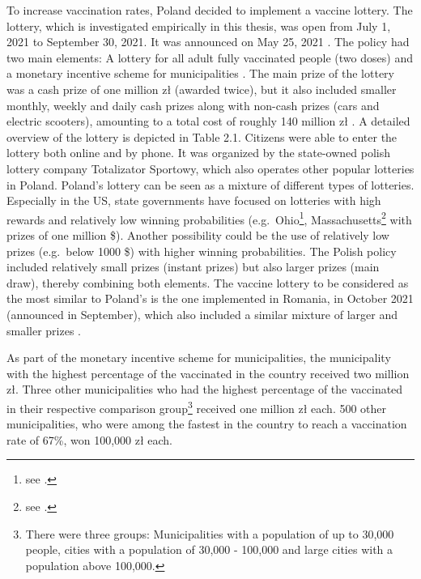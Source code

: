 \documentclass{scrbook}
\begin{document}
To increase vaccination rates, Poland decided to implement a vaccine
lottery. The lottery, which is investigated empirically in this thesis,
was open from July 1, 2021 to September 30, 2021. It was announced on
May 25, 2021 \parencite{charlish_poland_2021}. The policy had two main
elements: A lottery for all adult fully vaccinated people (two doses)
\parencite{service_of_the_republic_of_poland_national_2021} and a
monetary incentive scheme for municipalities
\parencite{service_of_the_republic_of_poland_competitions_2021}. The
main prize of the lottery was a cash prize of one million zł (awarded
twice), but it also included smaller monthly, weekly and daily cash
prizes along with non-cash prizes (cars and electric scooters),
amounting to a total cost of roughly 140 million zł
\parencite{wilczek_poland_2021}. A detailed overview of the lottery is
depicted in Table 2.1. Citizens were able to enter the lottery both
online and by phone. It was organized by the state-owned polish lottery
company Totalizator Sportowy, which also operates other popular
lotteries in Poland. Poland's lottery can be seen as a mixture of
different types of lotteries. Especially in the US, state governments
have focused on lotteries with high rewards and relatively low winning
probabilities
(e.g.~Ohio\footnote{see \textcite{ohio_department_of_health_ohio_2021}.},
Massachusetts\footnote{see \textcite{commonwealth_of_massachusetts_massachusetts_2021}.}
with prizes of one million \$). Another possibility could be the use of
relatively low prizes (e.g.~below 1000 \$) with higher winning
probabilities. The Polish policy included relatively small prizes
(instant prizes) but also larger prizes (main draw), thereby combining
both elements. The vaccine lottery to be considered as the most similar
to Poland's is the one implemented in Romania, in October 2021
(announced in September), which also included a similar mixture of
larger and smaller prizes
\parencite{health_ministry_of_romania_press_2021}.

As part of the monetary incentive scheme for municipalities, the
municipality with the highest percentage of the vaccinated in the
country received two million zł. Three other municipalities who had the
highest percentage of the vaccinated in their respective comparison
group\footnote{There were three groups: Municipalities with a population of up to 30,000 people, cities with a population of 30,000 - 100,000 and large cities with a population above 100,000.}
received one million zł each. 500 other municipalities, who were among
the fastest in the country to reach a vaccination rate of 67\%, won
100,000 zł each.
\end{document}
